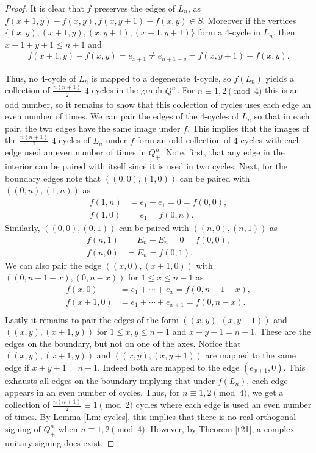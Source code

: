 \documentclass[11pt]{article}
\begin{document}
\begin{proof}
It is clear that $f$ preserves the edges of $L_n$, as $f(x+1, y) - f(x, y),  f(x, y+1) - f(x, y)\in S$. Moreover if the vertices $\{(x, y), (x+1, y), (x, y+1), (x+1, y+1) \}$ form a $4$-cycle in $L_n$, then $x+1+y+1 \leq n+1$ and 
\begin{align*}
    f(x+1, y) - f(x, y) = e_{x+1} \neq e_{n+1-y} = f(x, y+1) - f(x, y).
\end{align*}

Thus, no $4$-cycle of $L_n$ is mapped to a degenerate $4$-cycle, so $f(L_n)$ yields a collection of $\frac{n(n+1)}{2}$ $4$-cycles in the graph $Q_+^n$.
For $n \equiv 1, 2 \pmod{4}$ this is an odd number, 
so it remains to show that this collection of cycles uses each 
edge an even number of times. We can pair the edges 
of the $4$-cycles of $L_n$ so that in each pair, the two edges 
have the same image under $f$. This implies that the images of 
the $\frac{n(n+1)}{2}$ $4$-cycles of $L_n$ under $f$ form an odd 
collection of $4$-cycles with each edge used an even number of times
in $Q_+^n$. Note, first, that any edge in the interior can be paired 
with itself since it is used in two cycles. Next, for the boundary 
edges note that $((0,0), (1,0))$ can be paired 
with $((0, n), (1, n))$ as 
\begin{align*}
    f(1, n) &= e_1 + e_1 = 0 = f(0,0), \\
    f(1,0) &= e_1 = f(0,n).
\end{align*}
Similarly, $((0,0), (0, 1))$ can be paired with $((n, 0), (n, 1))$ as 
\begin{align*}
    f(n,1) &= E_n + E_n = 0 = f(0, 0), \\
    f(n, 0) &=  E_n  = f(0, 1).
\end{align*}
We can also pair the edge $((x, 0), (x+1, 0))$ 
with $((0, n+1-x), (0, n-x))$ for $1 \leq x \leq n-1$ as 
\begin{align*}
    f(x,0) &= e_1 + \cdots + e_x = f(0, n+1-x), \\
    f(x+1, 0) &= e_1 + \cdots + e_{x+1} = f(0, n-x). \\
\end{align*}
Lastly it remains to pair the edges of the form $((x, y), (x, y+1))$ 
and $((x, y), (x+1, y))$ for $1 \leq x,y \leq n-1$ and 
$x+y+1 = n+1$. These are the edges on the boundary, but not on
one of the axes. Notice that $((x, y), (x+1, y))$ and 
$((x, y), (x, y+1))$ are mapped to the same edge if $x+y+1 = n+1$. 
Indeed both are mapped to the edge $(e_{x+1}, 0)$. 
This exhausts all edges on the boundary implying that under 
$f(L_n)$, each edge appears in an even number of cycles. 
Thus, for $n \equiv 1, 2 \pmod{4}$, we get a collection 
of $\frac{n(n+1)}{2} \equiv 1 \pmod{2}$ cycles where each edge 
is used an even number of times. 
By Lemma \ref{Lm: cycles}, this implies that there 
is no real orthogonal signing of $Q_+^n$ 
when $n \equiv 1,2 \pmod{4}$. However, by  
Theorem \ref{t21}, a complex unitary signing does exist. 
\end{proof}
\end{document}
